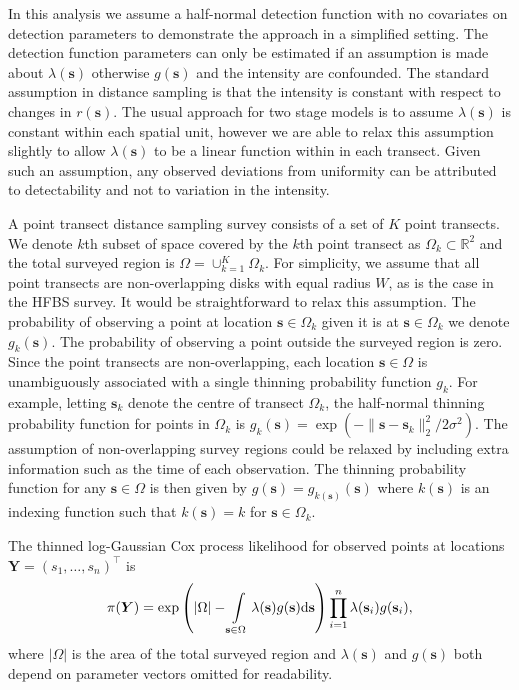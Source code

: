 \documentclass{stylefile16/statsoc}
\newcommand{\bs}{\mathbf{s}}
\newcommand{\bm}{\boldsymbol}  %
\begin{document}
In this analysis we assume a half-normal detection function with no covariates on detection parameters to demonstrate the approach in a simplified setting.  The detection function parameters can only be estimated if an assumption is made about $\lambda(\bs)$ otherwise $g(\bs)$ and the intensity are confounded.  The standard assumption in distance sampling is that the intensity is constant with respect to changes in $r(\bs)$. The usual approach for two stage models is to assume $\lambda(\bs)$ is constant within each spatial unit, however we are able to relax this assumption slightly to allow $\lambda(\bs)$ to be a linear function within in each transect.  Given such an assumption, any observed deviations from uniformity can be attributed to detectability and not to variation in the intensity.

A point transect distance sampling survey consists of a set of $K$ point transects.   We denote $k$th subset of space covered by the $k$th point transect as $\Omega_k \subset \mathbb{R}^2$ and the total surveyed region is $\Omega = \cup_{k=1}^K \Omega_k$.  For simplicity, we assume that all point transects are non-overlapping disks with equal radius $W$, as is the case in the HFBS survey.  It would be straightforward to relax this assumption.  The probability of observing a point at location $\bs \in \Omega_k$ given it is at $\bs \in \Omega_k$ we denote $g_k(\bs)$.  The probability of observing a point outside the surveyed region is zero.
Since the point transects are non-overlapping, each location $\bs \in \Omega$ is unambiguously associated with a single thinning probability function $g_k$.  For example, letting $\bs_k$ denote the centre of transect $\Omega_k$, the half-normal thinning probability function for points in $\Omega_k$ is $g_k(\bs) = \exp(-\lVert \bs - \bs_k \rVert_2^2 / 2\sigma^2)$.  The assumption of non-overlapping survey regions could be relaxed by including extra information such as the time of each observation.  The thinning probability function for any $\bs \in \Omega$ is then given by $g(\bs) = g_{k(\bs)}(\bs)$ where $k(\bs)$ is an indexing function such that $k(\bs) = k$ for $\bs \in \Omega_k$.

The thinned log-Gaussian Cox process likelihood for observed points at locations $\bm{Y} = (s_1, \ldots, s_n)^\intercal$ is
\begin{equation}
\label{lgcp-likelihood}
\pi(\bm{Y}) = \exp\left( |\Omega| -\int\displaylimits_{\bs \in \Omega} \lambda(\bs) g(\bs) \mathrm{d}\bs \right)\prod_{i=1}^n \lambda(\bs_i)g(\bs_i),
\end{equation}
where $|\Omega|$ is the area of the total surveyed region and $\lambda(\bs)$ and $g(\bs)$ both depend on parameter vectors omitted for readability.  
\end{document}
